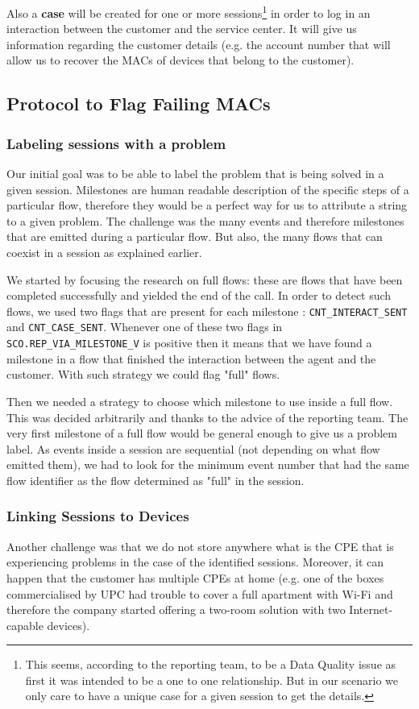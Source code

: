 Also a \textbf{case} will be created for one or more sessions\footnote{This seems, according to the reporting team, to be a Data Quality issue as first it was intended to be a one to one relationship. But in our scenario we only care to have a unique case for a given session to get the details.} in order to log in an interaction between the customer and the service center. It will give us information regarding the customer details (e.g. the account number that will allow us to recover the MACs of devices that belong to the customer).

\subsection{Protocol to Flag Failing MACs}
\subsubsection{Labeling sessions with a problem}
Our initial goal was to be able to label the problem that is being solved in a given session. Milestones are human readable description of the specific steps of a particular flow, therefore they would be a perfect way for us to attribute a string to a given problem. The challenge was the many events and therefore milestones that are emitted during a particular flow. But also, the many flows that can coexist in a session as explained earlier.

We started by focusing the research on full flows: these are flows that have been completed successfully and yielded the end of the call. In order to detect such flows, we used two flags that are present for each milestone : \texttt{CNT\_INTERACT\_SENT} and \texttt{CNT\_CASE\_SENT}. Whenever one of these two flags in \texttt{SCO.REP\_VIA\_MILESTONE\_V} is positive then it means that we have found a milestone in a flow that finished the interaction between the agent and the customer. With such strategy we could flag "full" flows.

Then we needed a strategy to choose which milestone to use inside a full flow. This was decided arbitrarily and thanks to the advice of the reporting team. The very first milestone of a full flow would be general enough to give us a problem label. As events inside a session are sequential (not depending on what flow emitted them), we had to look for the minimum event number that had the same flow identifier as the flow determined as "full" in the session. 

\subsubsection{Linking Sessions to Devices}
Another challenge was that we do not store anywhere what is the CPE that is experiencing problems in the case of the identified sessions. Moreover, it can happen that the customer has multiple CPEs at home (e.g. one of the boxes commercialised by UPC had trouble to cover a full apartment with Wi-Fi and therefore the company started offering a two-room solution with two Internet-capable devices). 

